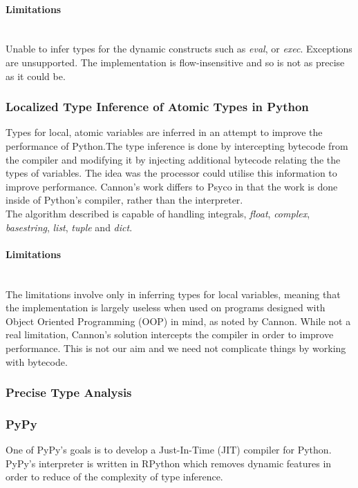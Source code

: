 \documentclass[12pt, titlepage]{article}
\begin{document}
\paragraph*{Limitations}\mbox{}\\
Unable to infer types for the dynamic constructs such as \textit{eval}, or \textit{exec}. Exceptions are unsupported. The implementation is flow-insensitive and so is not as precise as it could be.

\subsubsection{Localized Type Inference of Atomic Types in Python}
Types for local, atomic variables are inferred in an attempt to improve the performance of Python.The type inference is done by intercepting bytecode from the compiler and modifying it by injecting additional bytecode relating the the types of variables. The idea was the processor could utilise this information to improve performance. Cannon's work differs to Psyco in that the work is done inside of Python's compiler, rather than the interpreter. \\
The algorithm described is capable of handling integrals, \textit{float}, \textit{complex}, \textit{basestring}, \textit{list}, \textit{tuple} and \textit{dict}.\paragraph{Limitations}\mbox{}\\
The limitations involve only in inferring types for local variables, meaning that the implementation is largely useless when used on programs designed with Object Oriented Programming (OOP) in mind, as noted by Cannon. While not a real limitation, Cannon's solution intercepts the compiler in order to improve performance. This is not our aim and we need not complicate things by working with bytecode.

\subsubsection{Precise Type Analysis}

\subsubsection{PyPy}
One of PyPy's goals is to develop a Just-In-Time (JIT) compiler for Python. PyPy's interpreter is written in RPython which removes dynamic features in order to reduce of the complexity of type inference.
\end{document}

